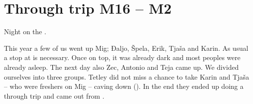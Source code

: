 \section{Through trip M16 -- M2}

\begin{marginfigure}
\checkoddpage \ifoddpage \forcerectofloat \else \forceversofloat \fi
\centering
 \caption{Night on the . }
 \label{plataeu moon}
\end{marginfigure}





This year a few of us went up Mig; Đaljo, Špela, Erik, Tjaša and Karin.
As usual a stop at  is necessary. Once on top, it was already dark
and most peoples were already asleep. The next day also Zec, Antonio
and Teja came up. We divided ourselves into three groups. Tetley did not
miss a chance to take Karin and Tjaša -- who were freshers on Mig -- caving
down  (). In the end they ended up doing a
through trip and came out from .


